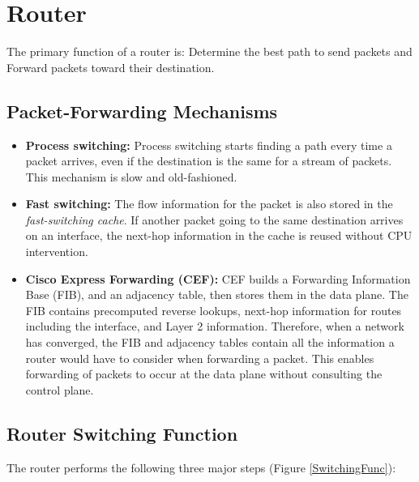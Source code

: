 \chapter{Router}

The primary function of a router is: Determine the best path to send packets and Forward packets toward their destination.

\section{Packet-Forwarding Mechanisms}

\begin{itemize}
\item \textbf{Process switching:} Process switching starts finding a path every time a packet arrives, even if the destination is the same for a stream of packets. This mechanism is slow and old-fashioned.

\item \textbf{Fast switching:} The flow information for the packet is also stored in the \emph{fast-switching cache}. If another packet going to the same destination arrives on an interface, the next-hop information in the cache is reused without CPU intervention.

\item \textbf{Cisco Express Forwarding (CEF):} CEF builds a Forwarding Information Base (FIB), and an adjacency table, then stores them in the data plane. The FIB contains precomputed reverse lookups, next-hop information for routes including the interface, and Layer 2 information. Therefore, when a network has converged, the FIB and adjacency tables contain all the information a router would have to consider when forwarding a packet. This enables forwarding of packets to occur at the data plane without consulting the control plane.
\end{itemize}

\section{Router Switching Function}

The router performs the following three major steps (Figure \ref{SwitchingFunc}):

